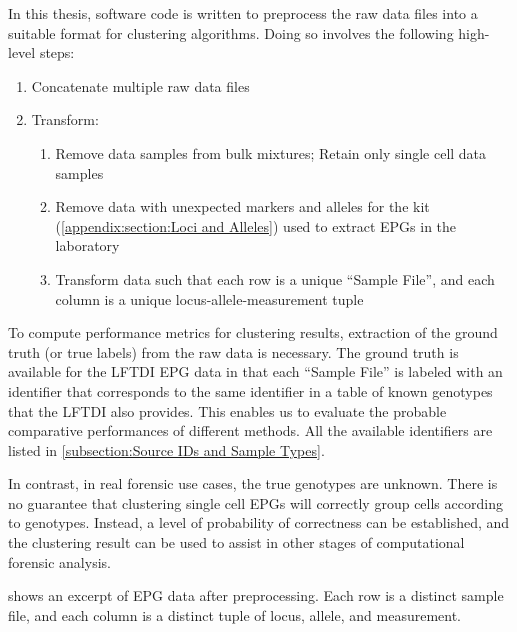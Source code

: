 In this thesis, software code is written to preprocess the raw data files into a suitable format for clustering algorithms. Doing so involves the following high-level steps:

\begin{enumerate}
  \item Concatenate multiple raw data files
  \item Transform:
  \begin{enumerate}
    \item Remove data samples from bulk mixtures; Retain only single cell data samples
    \item Remove data with unexpected markers and alleles for the kit (\cref{appendix:section:Loci and Alleles}) used to extract EPGs in the laboratory
    \item Transform data such that each row is a unique ``Sample File'', and each column is a unique locus-allele-measurement tuple
  \end{enumerate}
\end{enumerate}

To compute performance metrics for clustering results, extraction of the ground truth (or true labels) from the raw data is necessary. The ground truth is available for the LFTDI EPG data in that each ``Sample File'' is labeled with an identifier that corresponds to the same identifier in a table of known genotypes that the LFTDI also provides. This enables us to evaluate the probable comparative performances of different methods. All the available identifiers are listed in \cref{subsection:Source IDs and Sample Types}. 

In contrast, in real forensic use cases, the true genotypes are unknown. There is no guarantee that clustering single cell EPGs will correctly group cells according to genotypes. Instead, a level of probability of correctness can be established, and the clustering result can be used to assist in other stages of computational forensic analysis.

 shows an excerpt of EPG data after preprocessing. Each row is a distinct sample file, and each column is a distinct tuple of locus, allele, and measurement.


